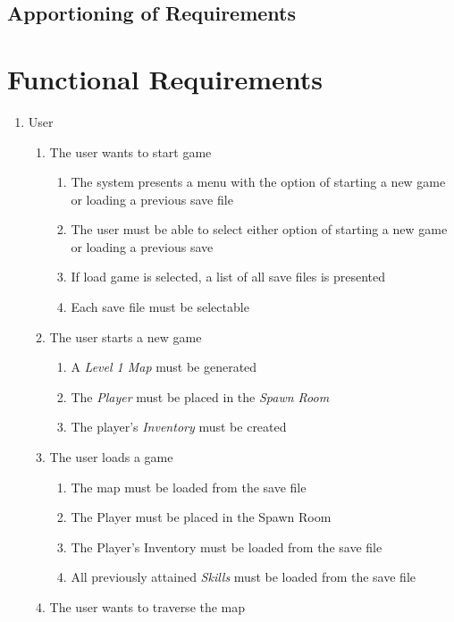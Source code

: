 \documentclass[12pt, titlepage]{article}
\begin{document}
  \subsection{Apportioning of Requirements}

\section{Functional Requirements}

\begin{enumerate}[{VP}1.]
  \item User
  \begin{enumerate}[{BE1}.1]
    \item The user wants to start game
    \begin{enumerate}
      \item The system presents a menu with the option of starting a new game or loading a previous save file
      \item The user must be able to select either option of starting a new game or loading a previous save
      \item If load game is selected, a list of all save files is presented
      \item Each save file must be selectable
    \end{enumerate}
    \item The user starts a new game
    \begin{enumerate}
      \item A \textit{Level 1 Map} must be generated
      \item The \textit{Player} must be placed in the \textit{Spawn Room}
      \item The player's \textit{Inventory} must be created
    \end{enumerate}
    \item The user loads a game
    \begin{enumerate}
      \item The map must be loaded from the save file
      \item The Player must be placed in the Spawn Room
      \item The Player's Inventory must be loaded from the save file
      \item All previously attained \textit{Skills} must be loaded from the save file
    \end{enumerate}
    \item The user wants to traverse the map
    \begin{enumerate}

\end{enumerate}
\end{enumerate}
\end{enumerate}
\end{document}
